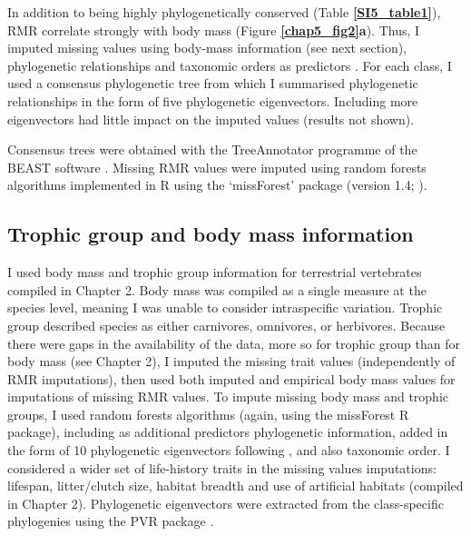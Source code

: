 In addition to being highly phylogenetically conserved (Table \textbf{\ref{SI5_table1}}), RMR correlate strongly with body mass (Figure \textbf{\ref{chap5_fig2}a}). Thus, I imputed missing values using body-mass information (see next section), phylogenetic relationships and taxonomic orders as predictors \citep{Penone2014}. For each class, I used a consensus phylogenetic tree from which I summarised phylogenetic relationships in the form of five phylogenetic eigenvectors. Including more eigenvectors had little impact on the imputed values (results not shown). 

Consensus trees were obtained with the TreeAnnotator programme of the BEAST software \citep{Bouckaert2014}. Missing RMR values were imputed using random forests algorithms implemented in R using the ‘missForest’ package (version 1.4; \citet{Stekhoven2012, Stekhoven2016}).  

\subsection{Trophic group and body mass information}

I used body mass and trophic group information for terrestrial vertebrates compiled in Chapter 2. Body mass was compiled as a single measure at the species level, meaning I was unable to consider intraspecific variation. Trophic group described species as either carnivores, omnivores, or herbivores. Because there were gaps in the availability of the data, more so for trophic group than for body mass (see Chapter 2), I imputed the missing trait values (independently of RMR imputations), then used both imputed and empirical body mass values for imputations of missing RMR values. To impute missing body mass and trophic groups, I used random forests algorithms (again, using the missForest R package), including as additional predictors phylogenetic information, added in the form of 10 phylogenetic eigenvectors \citep{DinizFilho2012} following \citet{Penone2014}, and also taxonomic order. I considered a wider set of life-history traits in the missing values imputations: lifespan, litter/clutch size, habitat breadth and use of artificial habitats (compiled in Chapter 2). Phylogenetic eigenvectors were extracted from the class-specific phylogenies using the PVR package \citep{Santos2018}.  

